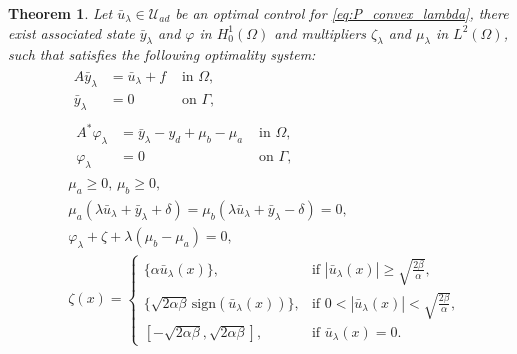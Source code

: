 \documentclass[11pt,a4paper]{amsart}
\newcommand{\om}{\Omega}
\newcommand{\ga}{\Gamma}
\newcommand{\sign}{\mathrm{sign}}
\newtheorem{theorem}{{Theorem}}
\begin{document}
\begin{theorem}\label{t:os1}
Let $\bar u_\lambda \in \mathcal{U}_{ad}$ be an optimal control for \eqref{eq:P_convex_lambda}, there exist associated state $\bar y_\lambda$ and $\varphi$ in $H_0^1(\om)$ and multipliers $\zeta_\lambda$ and $\mu_\lambda$  in $L^2(\om)$, such that satisfies the following optimality system:
\begin{subequations}\label{eq:optimal_system_regular}
\begin{align}
&\begin{array}{rlr}
	A\bar y_\lambda & = \bar u_\lambda +f & \text{ in } \om, \\
      \bar y_\lambda &= 0 & \text{ on } \ga, 
\end{array}\label{eq:os_reg_state}\\
%
&\,\begin{array}{rlr}
	A^*\varphi_\lambda & = \bar y_\lambda -y_d + \mu_b-\mu_a& \text{ in } \om, \\
      \varphi_\lambda &= 0 & \text{ on } \ga ,
\end{array}\label{eq:os_reg_adj}\\
&\mu_a\ge 0, \,\mu_b\ge 0, \label{eq:os_reg_nnmu}\\
&\mu_a(\lambda \bar{u}_\lambda+\bar{y}_\lambda+\delta)=\mu_b(\lambda \bar{u}_\lambda+\bar{y}_\lambda-\delta)=0, \label{eq:os_reg_compl}\\
& \varphi_\lambda  +\zeta +\lambda(\mu_b-\mu_a) =0, \label{eq:os_reg_grad} \\
&\zeta(x) = 
\begin{cases} 
\{\alpha \bar u_\lambda(x) \}, & \text{if } |\bar u_\lambda(x)| \geq \sqrt{\frac{2\beta}{\alpha}}, \\
\{\sqrt{2 \alpha \beta} \, \sign(\bar u_\lambda(x))\}, & \text{if } 0<|\bar u_\lambda(x)| < \sqrt{\frac{2\beta}{\alpha}}, \\
[-\sqrt{2 \alpha \beta},\sqrt{2 \alpha \beta}], & \text{if } \bar u_\lambda(x)=0.
\end{cases} \label{eq:os_reg_subgr}
%
\end{align}
\end{subequations}
%
\end{theorem}
\end{document}
